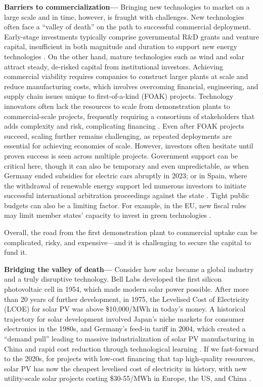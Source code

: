 \documentclass[pdflatex,sn-basic, Numbered]{sn-jnl}
\theoremstyle{thmstyleone}%
\theoremstyle{thmstyletwo}%
\theoremstyle{thmstylethree}%
\begin{document}
\textbf{Barriers to commercialization---} Bringing new technologies to market on a large scale and in time, however, is fraught with challenges.
New technologies often face a \enquote{valley of death} on the path to successful commercial deployment.
Early-stage investments typically comprise governmental R\&D grants and venture capital, insufficient in both magnitude and duration to support new energy technologies \cite{khatcherianBarriersTimelyDeployment2022}. On the other hand, mature technologies such as wind and solar attract steady, de-risked capital from institutional investors.
Achieving commercial viability requires companies to construct larger plants at scale and reduce manufacturing costs, which involves overcoming financial, engineering, and supply chain issues unique to first-of-a-kind (FOAK) projects. Technology innovators often lack the resources to scale from demonstration plants to commercial-scale projects, frequently requiring a consortium of stakeholders that adds complexity and risk, complicating financing \cite{khatcherianBarriersTimelyDeployment2022}.
Even after FOAK projects succeed, scaling further remains challenging, as repeated deployments are essential for achieving economies of scale. However, investors often hesitate until proven success is seen across multiple projects. Government support can be critical here, though it can also be temporary and even unpredictable, as when Germany ended subsidies for electric cars abruptly in 2023; or in Spain, where the withdrawal of renewable energy support led numerous investors to initiate successful international arbitration proceedings against the state \cite{gurtlerDismantlingRenewableEnergy2019}. Tight public budgets can also be a limiting factor. For example, in the EU, new fiscal rules may limit member states' capacity to invest in green technologies \cite{darvasImplicationsEuropeanUnions2024}.

Overall, the road from the first demonstration plant to commercial uptake can be complicated, risky, and expensive---and it is challenging to secure the capital to fund it.

\textbf{Bridging the valley of death---} Consider how solar became a global industry and a truly disruptive technology. Bell Labs developed the first silicon photovoltaic cell in 1954, which made modern solar power possible. After more than 20 years of further development, in 1975, the Levelised Cost of Electricity (LCOE) for solar PV was above \$10,000/MWh in today's money. A historical trajectory for solar development involved Japan's niche markets for consumer electronics in the 1980s, and Germany's feed-in tariff in 2004, which created a \enquote{demand pull} leading to massive industrialization of solar PV manufacturing in China and rapid cost reduction through technological learning \cite{nemetHowSolarEnergy2019}. If we fast-forward to the 2020s, for projects with low-cost financing that tap high-quality resources, solar PV has now the cheapest levelised cost of electricity in history, with new utility-scale solar projects costing \$30-55/MWh in Europe, the US, and China \cite{ieaWorldEnergyOutlook2024}.
\end{document}
